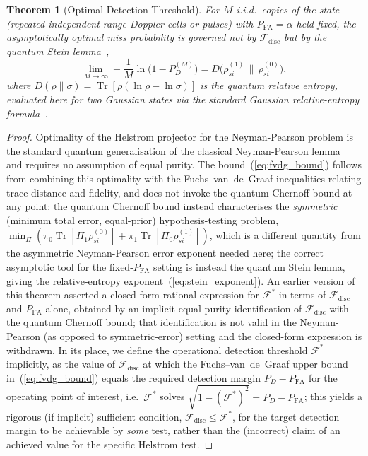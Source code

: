 \documentclass[journal]{IEEEtran}
\newtheorem{theorem}{Theorem}
\DeclareMathOperator{\Tr}{Tr}
\begin{document}
\begin{theorem}[Optimal Detection Threshold]
For $M$ i.i.d.\ copies of the state (repeated independent range-Doppler cells or pulses) with $P_{\text{FA}}=\alpha$ held fixed, the asymptotically optimal miss probability is governed not by $\mathcal F_{\text{disc}}$ but by the quantum Stein lemma~\cite{hiai1991proper,hayashi2017quantum},
\begin{equation}\label{eq:stein_exponent}
\lim_{M\to\infty} -\frac{1}{M}\ln\big(1-P_D^{(M)}\big) = D\big(\rho_{si}^{(1)}\,\|\,\rho_{si}^{(0)}\big),
\end{equation}
where $D(\rho\|\sigma)=\Tr[\rho(\ln\rho-\ln\sigma)]$ is the quantum relative entropy, evaluated here for two Gaussian states via the standard Gaussian relative-entropy formula~\cite{seshadreesan2018renyi}.
\end{theorem}

\begin{proof}
Optimality of the Helstrom projector for the Neyman-Pearson problem is the standard quantum generalisation of the classical Neyman-Pearson lemma~\cite{helstrom1976quantum} and requires no assumption of equal purity. The bound~(\ref{eq:fvdg_bound}) follows from combining this optimality with the Fuchs--van~de~Graaf inequalities relating trace distance and fidelity, and does not invoke the quantum Chernoff bound at any point: the quantum Chernoff bound instead characterises the \emph{symmetric} (minimum total error, equal-prior) hypothesis-testing problem, $\min_\Pi\left(\pi_0\Tr[\Pi_1\rho_{si}^{(0)}]+\pi_1\Tr[\Pi_0\rho_{si}^{(1)}]\right)$, which is a different quantity from the asymmetric Neyman-Pearson error exponent needed here; the correct asymptotic tool for the fixed-$P_{\text{FA}}$ setting is instead the quantum Stein lemma, giving the relative-entropy exponent~(\ref{eq:stein_exponent}). An earlier version of this theorem asserted a closed-form rational expression for $\mathcal F^{*}$ in terms of $\mathcal F_{\text{disc}}$ and $P_{\text{FA}}$ alone, obtained by an implicit equal-purity identification of $\mathcal F_{\text{disc}}$ with the quantum Chernoff bound; that identification is not valid in the Neyman-Pearson (as opposed to symmetric-error) setting and the closed-form expression is withdrawn. In its place, we define the operational detection threshold $\mathcal F^{*}$ implicitly, as the value of $\mathcal F_{\text{disc}}$ at which the Fuchs--van~de~Graaf upper bound in~(\ref{eq:fvdg_bound}) equals the required detection margin $P_D-P_{\text{FA}}$ for the operating point of interest, i.e.\ $\mathcal F^{*}$ solves $\sqrt{1-(\mathcal F^{*})^2} = P_D-P_{\text{FA}}$; this yields a rigorous (if implicit) sufficient condition, $\mathcal F_{\text{disc}}\leq \mathcal F^{*}$, for the target detection margin to be achievable by \emph{some} test, rather than the (incorrect) claim of an achieved value for the specific Helstrom test.
\end{proof}
\end{document}
